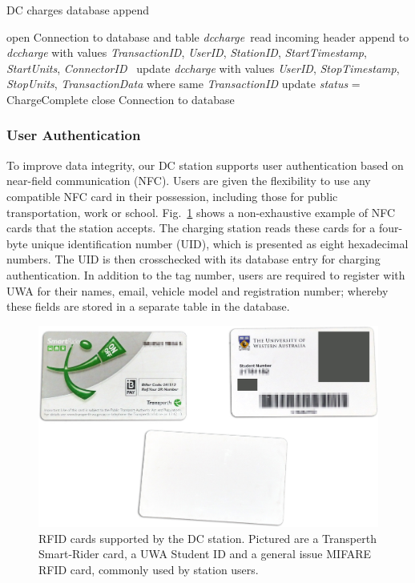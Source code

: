 \begin{algorithm}[H]
	\begin{flushleft}
		\caption{DC charges database append}\label{algo:9:dccharge}
		\begin{algorithmic}[1]
			\State open Connection to database and table \textit{dccharge}\
			\State read incoming header
			\State append to \textit{dccharge} with values \textit{TransactionID}, \textit{UserID}, \textit{StationID}, \hspace*{12.5mm}\textit{StartTimestamp}, \textit{StartUnits}, \textit{ConnectorID}\
			\EndIf
			\If{header is \textit{StopTransaction}}
			\State update \textit{dccharge} with values \textit{UserID}, \textit{StopTimestamp}, 
			\textit{StopUnits}, \hspace*{12.5mm}\textit{TransactionData} where same \textit{TransactionID}
			\State update \textit{status} = ChargeComplete
			\EndIf
			\State close Connection to database\
			\EndProcedure
		\end{algorithmic}
	\end{flushleft}
\end{algorithm}

\subsubsection{User Authentication}
To improve data integrity, our DC station supports user authentication based on near-field communication (NFC). Users are given the flexibility to use any compatible NFC card in their possession, including those for public transportation, work or school. Fig.~\ref{fig:9:tagdc} shows a non-exhaustive example of NFC cards that the station accepts. The charging station reads these cards for a four-byte unique identification number (UID), which is presented as eight hexadecimal numbers. The UID is then crosschecked with its database entry for charging authentication. In addition to the tag number, users are required to register with UWA for their names, email, vehicle model and registration number; whereby these fields are stored in a separate table in the database.

\begin{figure}[H]
	\centering
	\includegraphics[width=0.7\linewidth]{tag-dc}
	\caption[RFID cards supported by the DC station]{RFID cards supported by the DC station. Pictured are a Transperth Smart-Rider card, a UWA Student ID and a general issue MIFARE RFID card, commonly used by station users.}
	\label{fig:9:tagdc}
\end{figure}

